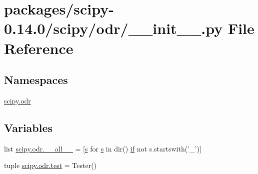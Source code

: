 \hypertarget{packages_2scipy-0_814_80_2scipy_2odr_2____init_____8py}{}\section{packages/scipy-\/0.14.0/scipy/odr/\+\_\+\+\_\+init\+\_\+\+\_\+.py File Reference}
\label{packages_2scipy-0_814_80_2scipy_2odr_2____init_____8py}
\subsection*{Namespaces}
\begin{DoxyCompactItemize}
\item 
 \hyperlink{namespacescipy_1_1odr}{scipy.\+odr}
\end{DoxyCompactItemize}
\subsection*{Variables}
\begin{DoxyCompactItemize}
\item 
list \hyperlink{namespacescipy_1_1odr_adb55b41e3e9d2104228d3c581744e215}{scipy.\+odr.\+\_\+\+\_\+all\+\_\+\+\_\+} = \mbox{[}\hyperlink{indexexpr_8h_ae024b0db549122b44c349ae28ec990dc}{s} for \hyperlink{indexexpr_8h_ae024b0db549122b44c349ae28ec990dc}{s} in dir() \hyperlink{minmax_8h_a30a0ee9fee303f01d9c5e6f669e0dfe9}{if} not s.\+startswith('\+\_\+')\mbox{]}
\item 
tuple \hyperlink{namespacescipy_1_1odr_a7216c7357f1ef6a2afb992a161f74063}{scipy.\+odr.\+test} = Tester()
\end{DoxyCompactItemize}
